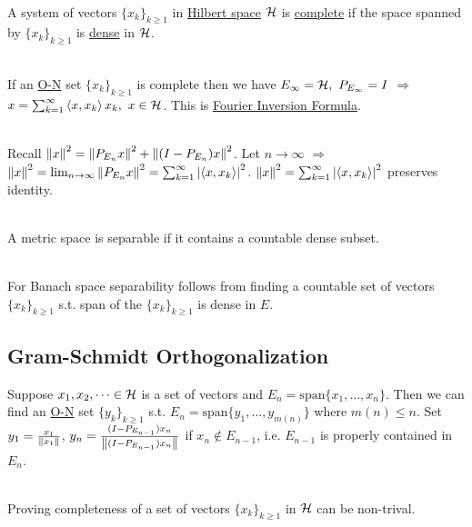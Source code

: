 \begin{definition}\ \\
A system of vectors $\{x_k\}_{k \geq 1}$ in \underline{Hilbert space} $\mathcal{H}$ is \underline{complete} if the space spanned by $\{x_k\}_{k \geq 1}$ is \underline{dense} in $\mathcal{H}$.
\end{definition}
\begin{remark}\ \\
    If an \underline{O-N} set $\{x_k\}_{k \geq 1}$ is complete then we have $E_\infty = \Hs,\ P_{E_\infty} = I$ $\Rightarrow$ $x = \sum_{k=1}^\infty \left\langle x, x_k \right\rangle x_k,\ x \in \mathcal{H}$. This is \underline{Fourier Inversion Formula}. 
\end{remark}
\begin{remark}\ \\
Recall $\norm{x}^2 = \norm{P_{E_n} x}^2 + \norm{(I - P_{E_n}) x}^2$. Let $n \to \infty$ $\Rightarrow$ $\norm{x}^2 = \lim_{n \to \infty} \norm{P_{E_n} x}^2 = \sum_{k=1}^\infty \abs{\left\langle x, x_k \right\rangle}^2$. $\norm{x}^2 = \sum_{k=1}^\infty \abs{\left\langle x, x_k \right\rangle}^2$ preserves identity. 
\end{remark}

\begin{definition}\ \\
A metric space is separable if it contains a countable dense subset.
\end{definition}
\begin{remark}\ \\
For Banach space separability follows from finding a countable set of vectors $\{x_k\}_{k \geq 1}$ s.t. span of the $\{x_k\}_{k \geq 1}$ is dense in $E$.
\end{remark}


\vspace{12pt}
\subsection{Gram-Schmidt Orthogonalization}

\np Suppose $x_1,x_2,\dots \in \mathcal{H}$ is a set of vectors and $E_n = \text{span}\{x_1,\dots,x_n\}$. Then we can find an \underline{O-N} set $\{y_k\}_{k \geq 1}$ s.t. $E_n = \text{span}\{y_1,\dots,y_{m(n)}\}$ where $m(n) \leq n$. Set $y_1 = \frac{x_1}{\norm{x_1}}$, $y_n = \frac{(I - P_{E_{n-1}} ) x_n}{\norm{(I - P_{E_{n-1}}) x_n}}$ if $x_n \not\in E_{n-1}$, i.e. $E_{n-1}$ is properly contained in $E_n$.
\begin{remark}\ \\
Proving completeness of a set of vectors $\{x_k\}_{k \geq 1}$ in $\mathcal{H}$ can be non-trival.
\end{remark}

